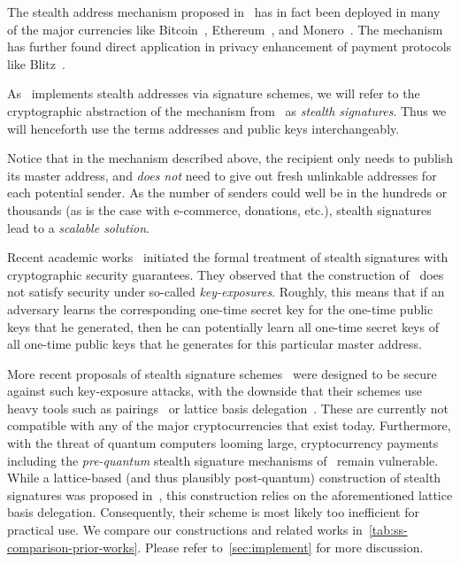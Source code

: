 The stealth address mechanism proposed in~\cite{stealth2} has in fact been deployed in many of the major currencies like Bitcoin~\cite{stealth1}, Ethereum~\cite{umbra}, and Monero~\cite{stealth2}.
The mechanism has further found direct application in privacy enhancement of payment protocols like Blitz~\cite{USENIX:AMKM21}.

As~\cite{stealth2} implements stealth addresses via signature schemes, we will refer to the cryptographic abstraction of the mechanism from~\cite{stealth2} as \emph{stealth signatures}. Thus we will henceforth use the terms addresses and public keys interchangeably.

Notice that in the mechanism described above, the recipient only needs to publish its master address, and \emph{does not} need to give out fresh unlinkable addresses for each potential sender. As the number of senders could well be in the hundreds or thousands (as is the case with e-commerce, donations, etc.), stealth signatures lead to a \emph{scalable solution}.

Recent academic works~\cite{EUROSP:LYWNW19,ESORICS:LLNYY20} initiated the formal treatment of stealth signatures with cryptographic security guarantees. They observed that the construction of~\cite{stealth2} does not satisfy security under so-called \emph{key-exposures}. Roughly, this means that if an adversary learns the corresponding one-time secret key for the one-time public keys that he generated, then he can potentially learn all one-time secret keys of all one-time public keys that he generates for this particular master address.

More recent proposals of stealth signature schemes~\cite{EUROSP:LYWNW19,ESORICS:LLNYY20} were designed to be secure against such key-exposure attacks, with the downside that their schemes use heavy tools such as pairings~\cite{C:BonFra01} or lattice basis delegation~\cite{EC:AgrBonBoy10}. These are currently not compatible with any of the major cryptocurrencies that exist today. Furthermore, with the threat of quantum computers looming large, cryptocurrency payments including the \emph{pre-quantum} stealth signature mechanisms of~\cite{stealth2,EUROSP:LYWNW19} remain vulnerable. While a lattice-based (and thus plausibly post-quantum) construction of stealth signatures was proposed in~\cite{ESORICS:LLNYY20}, this construction relies on the aforementioned lattice basis delegation. Consequently, their scheme is most likely too inefficient for practical use\footnotemark. We compare our constructions and related works in~\cref{tab:ss-comparison-prior-works}. Please refer to~\cref{sec:implement} for more discussion.

